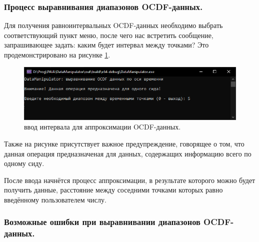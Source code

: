 \subsubsection{ \standartTitleFont
  Процесс выравнивания диапазонов OCDF-данных.
}

{\standartFont

  \par Для получения равноинтервальных OCDF-данных необходимо выбрать соответствующий пункт меню, после чего нас встретить сообщение, запрашивающее задать: каким будет интервал между точками? Это продемонстрировано на рисунке \ref{fig:OCDFappr}.

  \begin{figure}[H]
    \centering
    \includegraphics[width=\textwidth]{images/forDataManipulator/OCDFrightIntervals.png}
    \caption{ввод интервала для аппроксимации OCDF-данных.} 
    \label{fig:OCDFappr}
  \end{figure}

  \par Также на рисунке присутствует важное предупреждение, говорящее о том, что данная операция предназначеная для данных, содержащих информацию всего по одному сиду.

  \par После ввода начнётся процесс аппроксимации, в результате которого можно будет получить данные, расстояние между соседними точками которых равно введённому пользователем числу.  

  \par 
}

\subsubsection{ \standartTitleFont
  Возможные ошибки при выравнивании диапазонов OCDF-данных.
}

